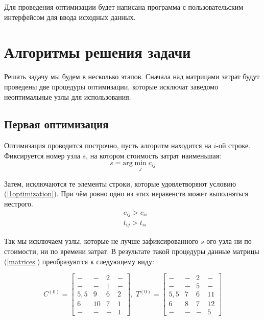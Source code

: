	Для проведения оптимизации будет написана программа с пользовательским интерфейсом для ввода исходных данных. 
	\newpage
	
	\section{Алгоритмы решения задачи}
	
	Решать задачу мы будем в несколько этапов. Сначала над матрицами затрат будут проведены две процедуры оптимизации, которые исключат заведомо неоптимальные узлы для использования.
	
	\subsection{Первая оптимизация}
	
	Оптимизация проводится построчно, пусть алгоритм находится на $i$-ой строке. Фиксируется номер узла $s$, на котором стоимость затрат наименьшая: 
	\begin{equation*}
		s = \mathrm{arg} \min_{j} c_{ij}
	\end{equation*}
	
	Затем, исключаются те элементы строки, которые удовлетворяют условию (\ref{1optimization}). При чём ровно одно из этих неравенств может выполняться нестрого. 
	\begin{equation}
		\begin{aligned}
			& c_{ij} > c_{is} \\
			& t_{ij} > t_{is}
		\end{aligned}
		\label{1optimization}
	\end{equation}
	
	Так мы исключаем узлы, которые не лучше зафиксированного $s$-ого узла ни по стоимости, ни по времени затрат. В результате такой процедуры данные матрицы (\ref{matrices}) преобразуются к следующему виду:
	
	\begin{equation}
		C^{(0)} = \begin{bmatrix*}
			-   & -  & 2 & - \\
			-   & -  & 1 & - \\
			5,5 & 9  & 6 & 2 \\
			6   & 10 & 7 & 1 \\
			-   & -  & - & 1
		\end{bmatrix*},\;
		T^{(0)} = \begin{bmatrix*}
			-   & - & 2 & -  \\
			-   & - & 5 & - \\
			5,5 & 7 & 6 & 11 \\
			6   & 8 & 7 & 12 \\
			-   & - & - & 5
		\end{bmatrix*}
		\label{matrices0}
	\end{equation}
	
